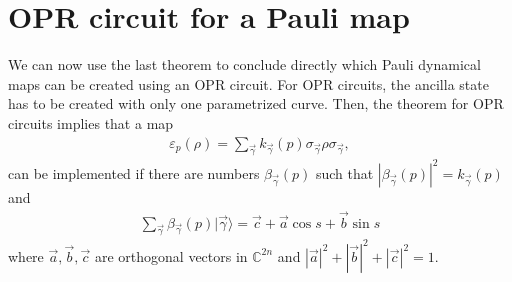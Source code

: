 \documentclass[10pt,letterpaper]{article} %
\begin{document}
\section{OPR circuit for a Pauli map} %
\label{sec: OPR circuit for a Pauli map}


We can now use the last theorem to conclude directly which Pauli dynamical maps
can be created using an OPR circuit.
For OPR circuits, the ancilla state has to be created with only one parametrized curve. Then, the theorem for OPR circuits implies that a map
\begin{eqnarray}
\varepsilon_p(\rho) = \sum_{\vec{\gamma}} k_{\vec{\gamma}}(p) \sigma_{\vec{\gamma}} \rho \sigma_{\vec{\gamma}},
\end{eqnarray}
can be implemented  if there are numbers $\beta_{\vec{\gamma}}(p)$ such that $|\beta_{\vec{\gamma}}(p)|^2 = k_{\vec{\gamma}}(p)$ and
\begin{eqnarray}
\sum_{\vec{\gamma}} \beta_{\vec{\gamma}}(p) |\vec{\gamma}\rangle = \vec{c} + \vec{a} \cos s + \vec{b} \sin s
\end{eqnarray}
where $\vec{a},\vec{b},\vec{c}$ are orthogonal vectors in $\mathbb{C}^{2n}$ 
and $|\vec{a}|^2+  |\vec{b}|^2 + |\vec{c}|^2= 1$.
\end{document}
